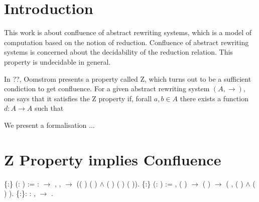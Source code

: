 
\begin{coqdoccode}
\end{coqdoccode}
\section{Introduction}





    This work is about confluence of abstract rewriting systems, which
    is a model of computation based on the notion of
    reduction. Confluence of abstract rewriting systems is concerned
    about the decidability of the reduction relation. This property is
    undecidable in general.


    In ??, Oomstrom presents a property called Z, which turns out to be a sufficient condiction to get confluence. For a given abstract rewriting system $(A,\to)$, one says that it satisfies the Z property if, forall $a,b \in A$ there exists a function $d: A \to A$ such that 


We present a formalisation ...




\section{Z Property implies Confluence}

\begin{coqdoccode}
\coqdocnoindent
{}  \{:\} (:  ) := \coqdoctac{\ensuremath{\exists}} : \ensuremath{\rightarrow} , \coqdockw{\ensuremath{\forall}}  ,    \ensuremath{\rightarrow} (( )  ( ) \ensuremath{\land} ( ) ( ) ( )).\coqdoceol
\coqdocemptyline
\coqdocnoindent
{}  \{:\} (:  ) := \coqdockw{\ensuremath{\forall}}   , ( )   \ensuremath{\rightarrow} ( )   \ensuremath{\rightarrow} (\coqdoctac{\ensuremath{\exists}} , ( )   \ensuremath{\land} ( )  ).\coqdoceol
\coqdocnoindent
{}  \{:\}: \coqdockw{\ensuremath{\forall}} :  ,   \ensuremath{\rightarrow}  .\coqdoceol
\end{coqdoccode}
